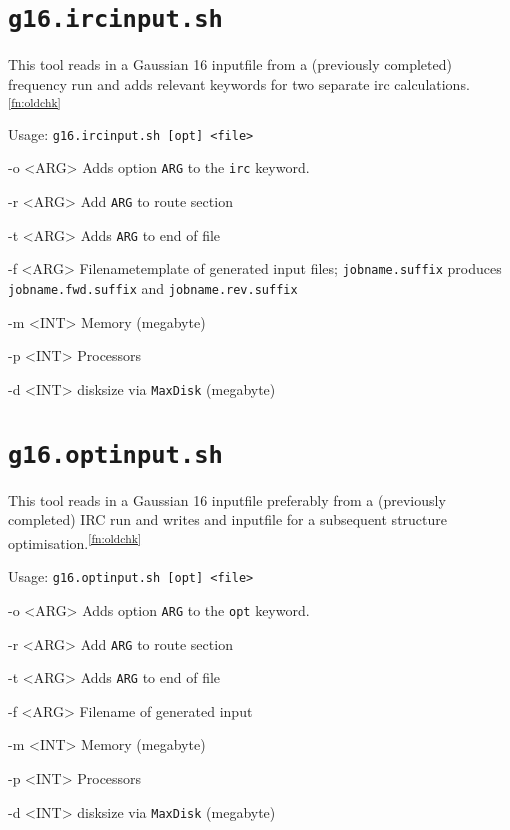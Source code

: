 \documentclass[final, a4paper, columns=3, margin=1.0cm, 10pt]{refcard}
\newcommand*{\footnoteref}[1]{\textsuperscript{\ref{#1}}}
\begin{document}
\section{\texttt{g16.ircinput.sh}}

This tool reads in a Gaussian 16 inputfile from a (previously completed) frequency run and 
adds relevant keywords for two separate irc calculations.\footnoteref{fn:oldchk}

Usage: \texttt{g16.ircinput.sh [opt] <file>}

\begin{refcardlist}[labelfont=\ttfamily]
  \item[-o <ARG>] Adds option \texttt{ARG} to the \texttt{irc} keyword.
  \item[-r <ARG>] Add \texttt{ARG} to route section
  \item[-t <ARG>] Adds \texttt{ARG} to end of file
  \item[-f <ARG>] Filenametemplate of generated input files; %
    \texttt{jobname.suffix} produces \texttt{jobname.fwd.suffix} and \texttt{jobname.rev.suffix} 
  \item[-m <INT>] Memory (megabyte)
  \item[-p <INT>] Processors
  \item[-d <INT>] disksize via \texttt{MaxDisk} (megabyte)
\end{refcardlist}

\section{\texttt{g16.optinput.sh}}

This tool reads in a Gaussian 16 inputfile preferably from a (previously completed) IRC run and 
writes and inputfile for a subsequent structure optimisation.\footnoteref{fn:oldchk}

Usage: \texttt{g16.optinput.sh [opt] <file>}

\begin{refcardlist}[labelfont=\ttfamily]
  \item[-o <ARG>] Adds option \texttt{ARG} to the \texttt{opt} keyword.
  \item[-r <ARG>] Add \texttt{ARG} to route section
  \item[-t <ARG>] Adds \texttt{ARG} to end of file
  \item[-f <ARG>] Filename of generated input
  \item[-m <INT>] Memory (megabyte)
  \item[-p <INT>] Processors
  \item[-d <INT>] disksize via \texttt{MaxDisk} (megabyte)
\end{refcardlist}
\end{document}
